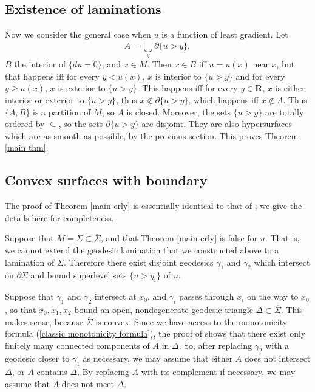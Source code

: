 \documentclass[reqno,12pt,letterpaper]{amsart}
\newcommand{\RR}{\mathbf{R}}
\theoremstyle{definition}
\numberwithin{equation}{section}
\begin{document}
\subsection{Existence of laminations}
Now we consider the general case when $u$ is a function of least gradient.
Let
\begin{equation}\label{lamination union}
A = \bigcup_y \partial \{u > y\},
\end{equation} $B$ the interior of $\{du = 0\}$, and $x \in M$.
Then $x \in B$ iff $u = u(x)$ near $x$, but that happens iff for every $y < u(x)$, $x$ is interior to $\{u > y\}$ and for every $y \geq u(x)$, $x$ is exterior to $\{u > y\}$.
This happens iff for every $y \in \RR$, $x$ is either interior or exterior to $\{u > y\}$, thus $x \notin \partial \{u > y\}$, which happens iff $x \notin A$.
Thus $\{A, B\}$ is a partition of $M$, so $A$ is closed.
Moreover, the sets $\{u > y\}$ are totally ordered by $\subseteq$, so the sets $\partial \{u > y\}$ are disjoint.
They are also hypersurfaces which are as smooth as possible, by the previous section.
This proves Theorem \ref{main thm}.

\subsection{Convex surfaces with boundary}
The proof of Theorem \ref{main crly} is essentially identical to that of \cite[Proposition 3.4]{górny2017planar}; we give the details here for completeness.

Suppose that $M = \Sigma \subset \overline \Sigma$, and that Theorem \ref{main crly} is false for $u$.
That is, we cannot extend the geodesic lamination that we constructed above to a lamination of $\overline \Sigma$.
Therefore there exist disjoint geodesics $\gamma_1$ and $\gamma_2$ which intersect on $\partial \Sigma$ and bound superlevel sets $\{u > y_i\}$ of $u$.

Suppose that $\gamma_1$ and $\gamma_2$ intersect at $x_0$, and $\gamma_i$ passes through $x_i$ on the way to $x_0$, so that $x_0, x_1, x_2$ bound an open, nondegenerate geodesic triangle $\Delta \subset \overline \Sigma$. This makes sense, because $\overline \Sigma$ is convex.
Since we have access to the monotonicity formula (\ref{classic monotonicity formula}), the proof of \cite[Remark 37.9]{simon1983GMT} shows that there exist only finitely many connected components of $A$ in $\Delta$.
So, after replacing $\gamma_2$ with a geodesic closer to $\gamma_1$ as necessary, we may assume that either $A$ does not intersect $\Delta$, or $A$ contains $\Delta$.
By replacing $A$ with its complement if necessary, we may assume that $A$ does not meet $\Delta$.
\end{document}
